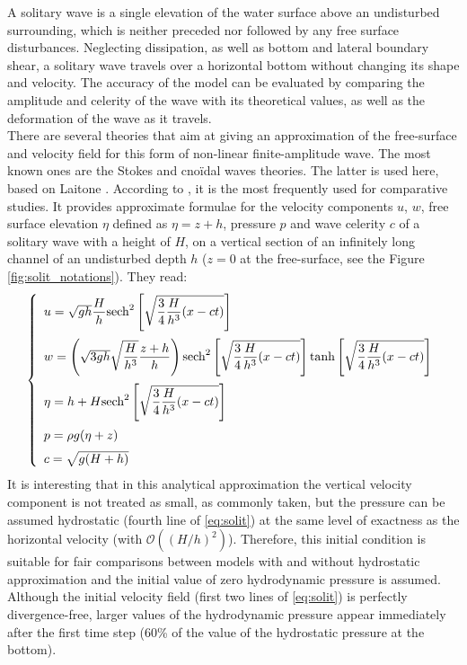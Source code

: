 A solitary wave is a single elevation of the water surface above an undisturbed surrounding,
which is neither preceded nor followed by any free surface disturbances. Neglecting
dissipation, as well as bottom and lateral boundary shear, a solitary wave travels over a
horizontal bottom without changing its shape and velocity.
The accuracy of the model can be evaluated by comparing the
amplitude and celerity of the wave with its theoretical values, as well as the deformation
of the wave as it travels.\\

There are several theories that aim at giving an approximation of the free-surface and velocity
field for this form of non-linear finite-amplitude wave. The most known ones are the Stokes and cnoïdal
waves theories. The latter is used here, based on Laitone \cite{Laitone1960}. According to \cite{Jankowski1999}, it
is the most frequently used for comparative studies.
It provides approximate formulae for the
velocity components $u$, $w$, free surface elevation $\eta$ defined as $\eta = z + h$,
pressure $p$ and wave celerity $c$ of a
solitary wave with a height of $H$, on a vertical section of an infinitely long channel of an undisturbed
depth $h$ ($z = 0$ at the free-surface, see the Figure \ref{fig:solit_notations}). They read:
\begin{equation}
\label{eq:solit}
\left\{\begin{array}{l}
u = \sqrt{gh}\dfrac{H}{h}\text{sech}^2\left[\sqrt{\dfrac{3}{4}\dfrac{H}{h^3}(x-ct)}\right] \medskip \\
w = \left(\sqrt{3gh}\sqrt{\dfrac{H}{h^3}}\dfrac{z+h}{h}\right)\text{sech}^2\left[\sqrt{\dfrac{3}{4}\dfrac{H}{h^3}(x-ct)}\right]
\text{tanh}\left[\sqrt{\dfrac{3}{4}\dfrac{H}{h^3}(x-ct)}\right] \medskip \\
\eta = h+H\text{sech}^2\left[\sqrt{\dfrac{3}{4}\dfrac{H}{h^3}(x-ct)}\right] \medskip \\
p= \rho g (\eta + z) \medskip \\
c = \sqrt{g(H+h)}
\end{array}\right.
\end{equation}
It is interesting that in this analytical approximation the vertical velocity component is
not treated as small, as commonly taken, but the pressure can be assumed hydrostatic
(fourth line of \eqref{eq:solit}) at the same level of exactness as the horizontal velocity
(with $\mathcal{O}((H/h)^2)$)\cite{Laitone1960}.
Therefore, this initial condition is suitable for fair comparisons between models
with and without hydrostatic approximation and the initial value of zero hydrodynamic
pressure is assumed. Although the initial velocity field (first two lines of \eqref{eq:solit})
is perfectly divergence-free, larger values of the hydrodynamic pressure appear immediately after the first time
step (60\% of the value of the hydrostatic pressure at the bottom).\\

